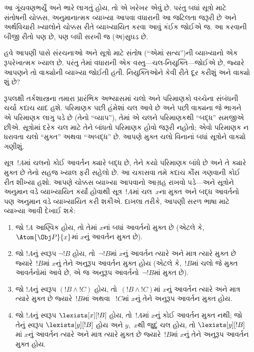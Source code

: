 આ ગૂંચવણભર્યું અને ભારે લાગતું હોય, તો એ ખરેખર એવું છે. પરંતુ બધાં
સૂત્રો માટે સંતોષની ચોક્કસ, અનુમાનાત્મક વ્યાખ્યા આપવા વધારાની આ
જટિલતા જરૂરી છે અને અર્થવિચારી ખ્યાલોને ચોક્કસ રીતે વ્યાખ્યાયિત કરવા
આવું કંઈક જોઈએ જ. આ કરવાની બીજી રીતો પણ છે, પણ બધી સરખી જ
(અ)સુઘડ છે.
\endgroup


\begingroup
\makeatletter{}\makeatother


\label{guunit:OLP-0144}


હવે આપણી પાસે સંરચનાઓ અને સૂત્રો માટે સંતોષ (``એમાં
સત્ય'')ની વ્યાખ્યાનો એક રૂપરેખાત્મક ખ્યાલ છે. પરંતુ તેમાં વધારાની એક
વસ્તુ---ચલ-નિયુક્તિ---જોઈએ છે, જ્યારે આપણને તો
વાક્યોની વ્યાખ્યા જોઈતી હતી. નિયુક્તિઓને કેવી રીતે દૂર કરીશું
અને વાક્યો શું છે?

રૂપલક્ષી તર્કશાસ્ત્રના તમારા પ્રારંભિક અભ્યાસમાં ચલો અને
પરિમાણકો વચ્ચેના સંબંધની ચર્ચા કદાચ યાદ હશે. પરિમાણક પછી હંમેશાં
ચલ આવે છે અને પછી વાક્યના જે ભાગને એ પરિમાણક લાગુ
પડે છે (તેનો ``વ્યાપ''), તેમાં એ ચલને પરિમાણકથી ``બદ્ધ''
સમજીએ છીએ. સૂત્રોમાં દરેક ચલ માટે તેને બાંધતો પરિમાણક
હોવો જરૂરી નહોતો; એવો પરિમાણક ન ધરાવતા ચલો ``મુક્ત'' અથવા
``અબદ્ધ'' છે. આપણે મુક્ત ચલો વિનાનાં બધાં સૂત્રોને
વાક્યો ગણીશું.

સૂત્ર~$!A$માં ચલનો કોઈ આવર્તન ક્યારે બદ્ધ છે, તેને
કયો પરિમાણક બાંધે છે અને તે ક્યારે મુક્ત છે તેનો સહજ ખ્યાલ ફરી સહેલો
છે. આ ચકાસવા તમે કદાચ કૌંસ ગણવાની કોઈ રીત શીખ્યા હશો. આપણે ચોક્કસ
વ્યાખ્યા આપવાનો આગ્રહ રાખવો પડે---અને સૂત્રોને અનુમાન વડે
વ્યાખ્યાયિત કર્યાં હોવાથી સૂત્ર~$!A$માં ચલ~$x$ના
મુક્ત અને બદ્ધ આવર્તનો પણ અનુમાન વડે વ્યાખ્યાયિત કરી શકીએ. દાખલા
તરીકે, આપણી સરળ ભાષા માટે વ્યાખ્યા આવી દેખાઈ શકે:
\begin{enumerate}
  \item જો $!A$ આણ્વિક હોય, તો તેમાં $x$નાં બધાં આવર્તનો મુક્ત છે
  (એટલે કે,~$\Atom{\Obj P}{x}$માં $x$નું આવર્તન મુક્ત છે).
  \item જો $!A$નું સ્વરૂપ $\lnot !B$ હોય, તો~$\lnot !B$માં $x$નું
  આવર્તન ત્યારે અને માત્ર ત્યારે મુક્ત છે જ્યારે~$!B$માં $x$નું તેને
  અનુરૂપ આવર્તન મુક્ત હોય (એટલે કે,~$!B$માં ચલો જે મુક્ત આવર્તનોમાં
  આવે છે, એ જ અનુરૂપ આવર્તનો~$\lnot !B$માં મુક્ત છે).
  \item જો $!A$નું સ્વરૂપ $(!B \land !C)$ હોય, તો~$(!B \land !C)$માં
  $x$નું આવર્તન ત્યારે અને માત્ર ત્યારે મુક્ત છે જ્યારે~$!B$માં અથવા
  ~$!C$માં $x$નું તેને અનુરૂપ આવર્તન મુક્ત હોય.
  \item જો $!A$નું સ્વરૂપ $\lexists[x][!B]$ હોય, તો~$!A$માં $x$નું
  કોઈ આવર્તન મુક્ત નથી; જો તેનું સ્વરૂપ $\lexists[y][!B]$ હોય અને
  $y$,~$x$થી જુદું ચલ હોય, તો $\lexists[y][!B]$માં $x$નું
  આવર્તન ત્યારે અને માત્ર ત્યારે મુક્ત છે જ્યારે~$!B$માં $x$નું તેને
  અનુરૂપ આવર્તન મુક્ત હોય.
\end{enumerate}

